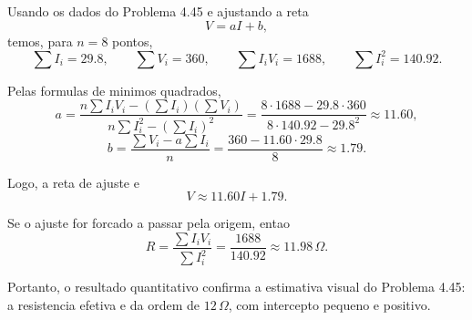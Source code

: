 Usando os dados do Problema 4.45 e ajustando a reta
\[
V=aI+b,
\]
temos, para $n=8$ pontos,
\[
\sum I_i=29.8,
\qquad
\sum V_i=360,
\qquad
\sum I_iV_i=1688,
\qquad
\sum I_i^2=140.92.
\]

Pelas formulas de minimos quadrados,
\[
a=\frac{n\sum I_iV_i-(\sum I_i)(\sum V_i)}{n\sum I_i^2-(\sum I_i)^2}
=\frac{8\cdot1688-29.8\cdot360}{8\cdot140.92-29.8^2}
\approx 11.60,
\]
\[
b=\frac{\sum V_i-a\sum I_i}{n}
=\frac{360-11.60\cdot29.8}{8}
\approx 1.79.
\]

Logo, a reta de ajuste e
\[
V\approx 11.60I+1.79.
\]

Se o ajuste for forcado a passar pela origem, entao
\[
R=\frac{\sum I_iV_i}{\sum I_i^2}=\frac{1688}{140.92}\approx 11.98\,\Omega.
\]

Portanto, o resultado quantitativo confirma a estimativa visual do Problema 4.45: a resistencia efetiva e da ordem de $12\,\Omega$, com intercepto pequeno e positivo.